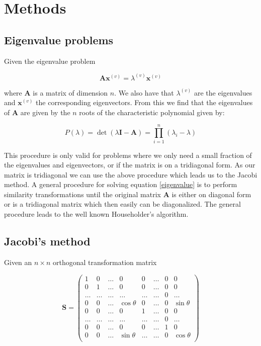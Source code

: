 \documentclass[a4paper, fontsize=11pt]{article}
\begin{document}
\section{Methods}


\subsection{Eigenvalue problems}
Given the eigenvalue problem 

\begin{equation} \label{eigenvalue}
\textbf{A}\textbf{x}^{(v)}=\lambda^{(v)}\textbf{x}^{(v)}
\end{equation}

where \textbf{A} is a matrix of dimension $n$. We also have that $\lambda^{(v)}$ are the eigenvalues and $\textbf{x}^{(v)}$ the corresponding eigenvectors. From this we find that the eigenvalues of \textbf{A} are given by the $n$ roots of the characteristic polynomial given by:

\begin{equation}
P(\lambda)=\det(\lambda \textbf{I} - \textbf{A}) = \prod^{n}_{i=1}(\lambda_{i} - \lambda)
\end{equation}

This procedure is only valid for problems where we only need a small fraction of the eigenvalues and eigenvectors, or if the matrix is on a tridiagonal form. As our matrix is tridiagonal we can use the above procedure which leads us to the Jacobi method. A general procedure for solving equation \eqref{eigenvalue} is to perform similarity transformations until the original matrix \textbf{A} is either on diagonal form or is a tridiagonal matrix which then easily can be diagonalized. The general procedure leads to the well known Householder's algorithm.\cite{Jensen}


\subsection{Jacobi's method}
Given an $n \times n$ orthogonal transformation matrix

\begin{equation}
\textbf{S} =
\begin{pmatrix}
1 & 0 & \hdots & 0 & 0 & \hdots & 0 & 0 \\
0 & 1 & \hdots & 0 & 0 & \hdots & 0 & 0 \\
\hdots & \hdots & \hdots & \hdots & \hdots & \hdots & 0 & \hdots \\ 
0 & 0 & \hdots & \cos \theta & 0 & \hdots & 0 & \sin \theta \\
0 & 0 & \hdots & 0 & 1 & \hdots & 0 & 0 \\
\hdots & \hdots & \hdots & \hdots & \hdots & \hdots & 0 & \hdots \\
0 & 0 & \hdots & 0 & 0 & \hdots & 1 & 0 \\ 
0 & 0 & \hdots & \sin \theta & \hdots & \hdots & 0 & \cos \theta \\
\end{pmatrix}
\end{equation}
\end{document}

